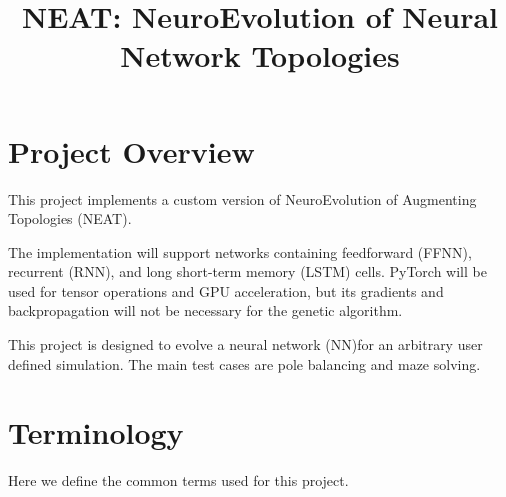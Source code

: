 \documentclass[11pt]{article}
\title{\textbf{NEAT: NeuroEvolution of Neural Network Topologies}}
\author{}
\date{}
\begin{document}
\maketitle

\tableofcontents

\newpage

\section{Project Overview}

This project implements a custom version of NeuroEvolution of Augmenting
Topologies (NEAT).

The implementation will support networks containing feedforward (FFNN),
recurrent (RNN), and long short-term memory (LSTM) cells. PyTorch will be
used for tensor operations and GPU acceleration, but its gradients and backpropagation will not be necessary for the genetic algorithm.

This project is designed to evolve a neural network (NN)for an arbitrary user defined simulation. The main test cases are pole balancing and maze solving.

\section{Terminology}

Here we define the common terms used for this project.
\end{document}
